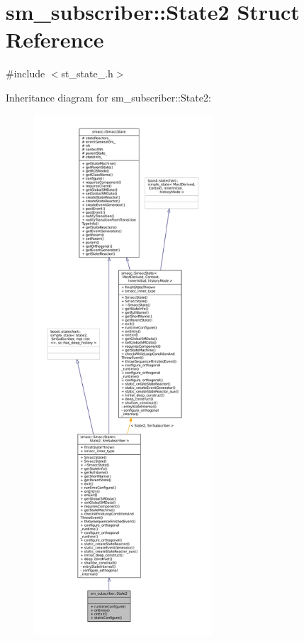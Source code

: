 \hypertarget{structsm__subscriber_1_1State2}{}\section{sm\+\_\+subscriber\+:\+:State2 Struct Reference}
\label{structsm__subscriber_1_1State2}


{\ttfamily \#include $<$st\+\_\+state\+\_.\+h$>$}



Inheritance diagram for sm\+\_\+subscriber\+:\+:State2\+:
\nopagebreak
\begin{figure}[H]
\begin{center}
\leavevmode
\includegraphics[height=550pt]{structsm__subscriber_1_1State2__inherit__graph}
\end{center}
\end{figure}


